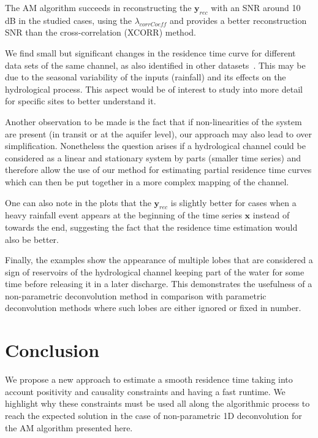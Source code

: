 \documentclass[]{elsarticle} %
\begin{document}
The AM algorithm succeeds in reconstructing the $\textbf{y}_{rec}$ with an SNR around 10 dB in the studied cases, using the $\lambda_{corrCoeff}$ and provides a better reconstruction SNR than the cross-correlation (XCORR) method. 

We find small but significant changes in the residence time curve for different data sets of the same channel, as also identified in other datasets~\cite{Z_Hydro_Delbart_2014}. This may be due to the seasonal variability of the inputs (rainfall) and its effects on the hydrological process. This aspect would be of interest to study into more detail for specific sites to better understand it.

Another observation to be made is the fact that if non-linearities of the system are present (in transit or at the aquifer level), our approach may also lead to over simplification. Nonetheless the question arises if a hydrological channel could be considered as a linear and stationary system by parts (smaller time series) and therefore allow the use of our method for estimating partial residence time curves which can then be put together in a more complex mapping of the channel.

One can also note in the plots that the $\textbf{y}_{rec}$ is slightly better for cases when a heavy rainfall event appears at the beginning of the time series $\textbf{x}$ instead of towards the end, suggesting the fact that the residence time estimation would also be better.

Finally, the examples show the appearance of multiple lobes that are considered a sign of reservoirs of the hydrological channel keeping part of the water for some time before releasing it in a later discharge. This demonstrates the usefulness of a non-parametric deconvolution method in comparison with parametric deconvolution methods where such lobes are either ignored or fixed in number.

\section{Conclusion}
\label{sec:conclusion}

We propose a new approach to estimate a smooth residence time taking into account positivity and causality constraints and having a fast runtime. We highlight why these constraints must be used all along the algorithmic process to reach the expected solution in the case of non-parametric 1D deconvolution for the AM algorithm presented here.
\end{document}
